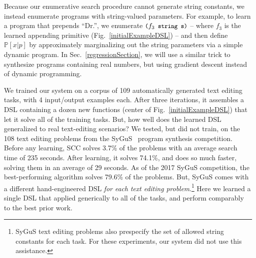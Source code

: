 \documentclass{article}
\newcommand{\system}{\textsc{SCC} }
\newcommand{\code}[1]{{\footnotesize\texttt{#1}}}
\newcommand{\probability}{\mathds{P}} %
\begin{document}
Because our enumerative search procedure cannot generate string
constants, we instead enumerate programs with string-valued
parameters.  For example, to learn a program that prepends ``Dr.'', we
enumerate $\text{\code{(}}f_3\code{ string s)}$ -- where $f_3$ is the
learned appending primitive (Fig.~\ref{initialExampleDSL}) -- and then
define $\probability[x|p]$ by approximately marginalizing out the
string parameters via a simple dynamic program.
In Sec.~\ref{regressionSection}, we will use a similar trick to
synthesize programs containing real numbers, but using gradient
descent instead of dynamic programming.

We trained our system on a corpus of 109 automatically generated text editing tasks, with 4 input/output examples each.
After three iterations, it assembles a DSL containing a dozen new functions (center of Fig.~\ref{initialExampleDSL}) that let it solve 
all of the training tasks.
But, how well does the  learned DSL generalized to real text-editing scenarios?
We tested, but did not train, on the 108 text editing problems from the SyGuS~\cite{alur2016sygus} program synthesis competition. Before any learning,
\system solves 3.7\% of the problems with an average search time of 235 seconds.
After learning,
it solves 74.1\%, and does so much faster,
solving them in an average of 29 seconds.
As of the 2017 SyGuS competition,
the best-performing algorithm solves 79.6\% of the problems.
But, SyGuS comes with a
different hand-engineered DSL \emph{for each text editing problem}.\footnote{SyGuS text editing problems also prespecify the set of allowed string constants for each task. For these experiments, our system did not use this assistance.}
Here  we learned a single DSL
that applied generically to
all of the tasks,
and perform comparably to the best
prior work.
\end{document}
